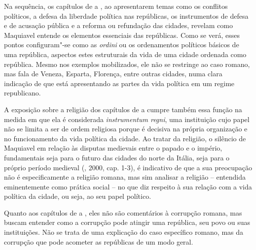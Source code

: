 Na sequência, os capítulos de  a , ao apresentarem temas como os
conflitos políticos, a defesa da liberdade política nas repúblicas, os
instrumentos de defesa e de acusação pública e a reforma ou refundação
das cidades, revelam como Maquiavel entende os elementos essenciais das
repúblicas. Como se verá, esses pontos configuram"-se como as
\emph{ordini} ou os ordenamentos políticos básicos de uma república,
aspectos estes estruturais da vida de uma cidade ordenada como
república. Mesmo nos exemplos mobilizados, ele não se restringe ao caso
romano, mas fala de Veneza, Esparta, Florença, entre outras cidades,
numa clara indicação de que está apresentando as partes da vida política
em um regime republicano.

A exposição sobre a religião dos capítulos de  a  cumpre também essa
função na medida em que ela é considerada \emph{instrumentum regni}, uma
instituição cujo papel não se limita a ser de ordem religiosa porque é
decisiva na própria organização e no funcionamento da vida política da
cidade. Ao tratar da religião, o silêncio de Maquiavel em relação às
disputas medievais entre o papado e o império, fundamentais seja para o
futuro das cidades do norte da Itália, seja para o próprio período
medieval (, 2000, cap. 1-3), é indicativo de que a sua
preocupação não é especificamente a religião romana, mas sim analisar a
religião -- entendida eminentemente como prática social -- no que diz
respeito à sua relação com a vida política da cidade, ou seja, ao seu
papel político.

Quanto aos capítulos de  a , eles não são comentários à
corrupção romana, mas buscam entender como a corrupção pode atingir uma
república, seu povo ou suas instituições. Não se trata de uma explicação
do caso específico romano, mas da corrupção que pode acometer as
repúblicas de um modo geral.

